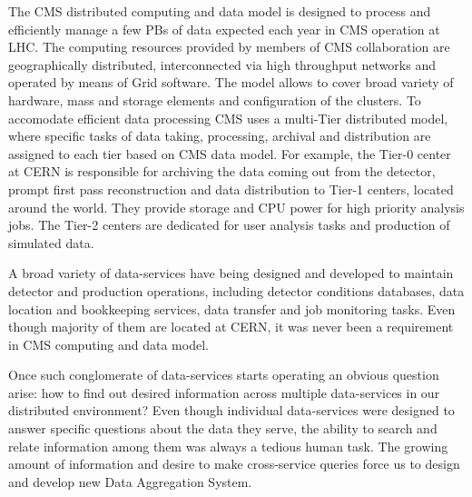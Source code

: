 \documentclass[1p,times]{elsarticle}
\begin{document}
The CMS distributed computing and data model \cite{CMSDataModel} 
is designed to process
and efficiently manage a few PBs of data expected each year
in CMS operation at LHC. The computing resources provided by members of CMS
collaboration are geographically distributed, 
interconnected via high throughput networks and operated by means 
of Grid software. The model allows to cover broad variety of
hardware, mass and storage elements and configuration of the
clusters. To accomodate efficient data processing CMS uses
a multi-Tier distributed model, where specific tasks of data taking,
processing, archival and distribution are assigned to each tier based
on CMS data model. For example, the Tier-0 center at CERN is responsible
for archiving the data coming out from the detector, prompt first pass reconstruction
and data distribution to Tier-1 centers, located around the world.
They provide storage and CPU power for high priority analysis jobs.
The Tier-2 centers
are dedicated for user analysis tasks and production of simulated data.

A broad variety of data-services have being designed and developed to
maintain detector and production operations, including detector
conditions databases, data location and bookkeeping services,
data transfer and job monitoring tasks. Even though majority of them
are located at CERN, it was never been a requirement in CMS computing
and data model. 

Once such conglomerate of data-services starts operating an obvious
question arise: how to find out desired information across multiple data-services
in our distributed environment? Even though individual data-services were designed
to answer specific questions about the data they serve, the ability to search and relate
information among them was always a tedious human task. The growing amount of information
and desire to make cross-service queries force us to design and develop new
Data Aggregation System.
\end{document}
